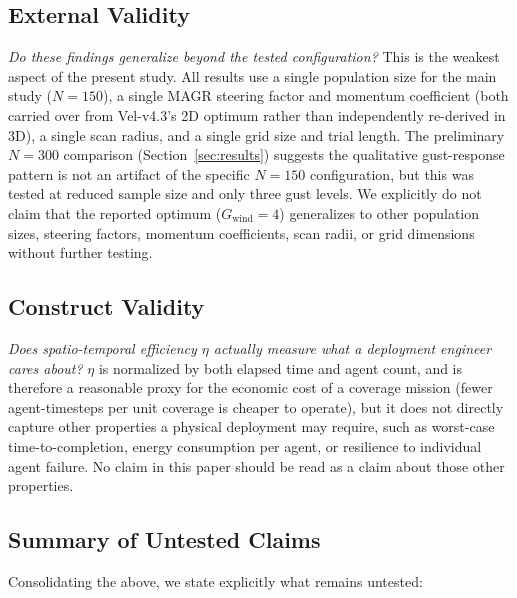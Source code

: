 \documentclass[10pt,journal]{IEEEtran}
\begin{document}
\subsection{External Validity}
\textit{Do these findings generalize beyond the tested configuration?}
This is the weakest aspect of the present study. All results use a single
population size for the main study ($N=150$), a single MAGR steering
factor and momentum coefficient (both carried over from Vel-v4.3's 2D
optimum rather than independently re-derived in 3D), a single scan radius,
and a single grid size and trial length. The preliminary $N=300$ comparison
(Section~\ref{sec:results}) suggests the qualitative gust-response pattern
is not an artifact of the specific $N=150$ configuration, but this was
tested at reduced sample size and only three gust levels. We explicitly do
not claim that the reported optimum ($G_{\text{wind}}=4$) generalizes to
other population sizes, steering factors, momentum coefficients, scan
radii, or grid dimensions without further testing.

\subsection{Construct Validity}
\textit{Does spatio-temporal efficiency $\eta$ actually measure what a
deployment engineer cares about?} $\eta$ is normalized by both elapsed time
and agent count, and is therefore a reasonable proxy for the economic cost
of a coverage mission (fewer agent-timesteps per unit coverage is cheaper
to operate), but it does not directly capture other properties a physical
deployment may require, such as worst-case time-to-completion, energy
consumption per agent, or resilience to individual agent failure. No claim
in this paper should be read as a claim about those other properties.

\subsection{Summary of Untested Claims}
Consolidating the above, we state explicitly what remains untested:
\end{document}
